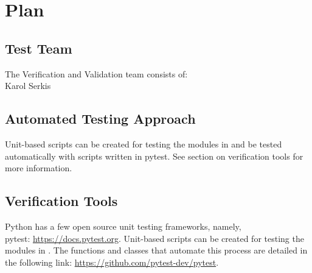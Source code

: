 \documentclass[12pt, titlepage]{article}
\begin{document}

\section{Plan}
	

\subsection{Test Team}

The Verification and Validation team consists of:\\
Karol Serkis

\subsection{Automated Testing Approach}

Unit-based scripts can be created for testing the modules in \progname{}and be tested automatically with 
scripts written in pytest. See section on verification tools for more information.

\subsection{Verification Tools}

Python has a few open source unit testing frameworks, namely, \\pytest: \url{https://docs.pytest.org}. 
Unit-based scripts can be created for testing the modules in \progname. The functions and classes that automate 
this process are detailed in the following link: 
\url{https://github.com/pytest-dev/pytest}.\\

		
\end{document}
